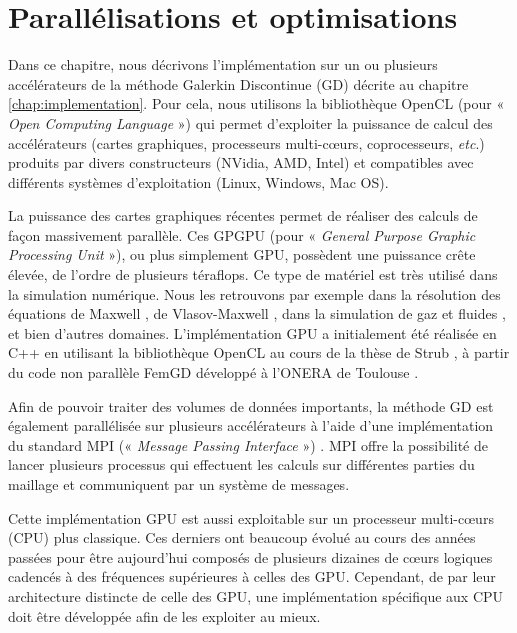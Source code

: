 \chapter{Parallélisations et optimisations}
\label{chap:parallelisations_et_optimisations}


Dans ce chapitre, nous décrivons l’implémentation sur un ou plusieurs
accélérateurs de la méthode Galerkin Discontinue (GD) décrite au chapitre \ref{chap:implementation}.
Pour cela, nous utilisons la bibliothèque OpenCL
(pour « \textit{Open Computing Language} ») \cite{opencl} qui permet d’exploiter la puissance
de calcul des accélérateurs (cartes graphiques, processeurs multi-cœurs, coprocesseurs, \textit{etc}.) produits par divers constructeurs
(NVidia, AMD, Intel) et compatibles avec différents systèmes d’exploitation (Linux, Windows, Mac OS).

La puissance des cartes graphiques récentes permet de réaliser des calculs
de façon massivement parallèle. Ces GPGPU (pour « \textit{General Purpose Graphic Processing Unit} »), ou plus simplement GPU, possèdent une puissance crête élevée, de l’ordre
de plusieurs téraflops. Ce type de matériel est très utilisé dans la simulation numérique.
Nous les retrouvons par exemple dans la résolution des équations de Maxwell
\cite{cabel:inria-00583617, Klockner:2009:NDG:1613335.1613429},
de Vlasov-Maxwell \cite{crestetto:hal-00731021}, dans la simulation
de gaz et fluides \cite{devuyst:hal-00687566, helluy:hal-00957020},
et bien d'autres domaines.
L'implémentation GPU a initialement été réalisée en C++ en utilisant la bibliothèque
OpenCL au cours de la thèse de Strub \cite{strub:tel-01651258}, à partir du code non parallèle
FemGD développé à l'ONERA de Toulouse \cite{Coh-Fer-Per-2006-1}.

Afin de pouvoir traiter des volumes de données importants, la méthode GD est
également parallélisée sur plusieurs accélérateurs à l'aide d'une implémentation du standard
MPI (« \textit{Message Passing Interface} ») \cite{10.1007/978-3-0348-8534-8_21}. MPI offre la possibilité de lancer plusieurs
processus qui effectuent les calculs sur différentes parties du maillage
et communiquent par un système de messages.

Cette implémentation GPU est aussi exploitable sur un processeur multi-cœurs
(CPU) plus classique. Ces derniers ont beaucoup évolué au cours des années passées
pour être aujourd'hui composés de plusieurs dizaines de cœurs logiques cadencés
à des fréquences supérieures à celles des GPU. Cependant, de par leur architecture
distincte de celle des GPU, une implémentation spécifique aux CPU doit être
développée afin de les exploiter au mieux.

